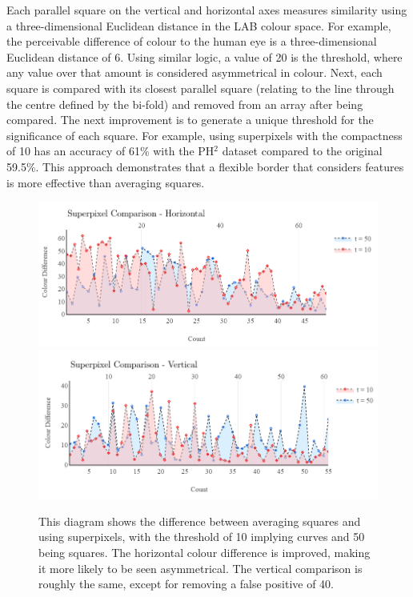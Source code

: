 Each parallel square on the vertical and horizontal axes measures similarity using a three-dimensional Euclidean distance in the LAB colour space. For example, the perceivable difference of colour to the human eye is a three-dimensional Euclidean distance of 6\cite{Myridis2014a}. Using similar logic, a value of 20 is the threshold, where any value over that amount is considered asymmetrical in colour. Next, each square is compared with its closest parallel square (relating to the line through the centre defined by the bi-fold) and removed from an array after being compared. The next improvement is to generate a unique threshold for the significance of each square. For example, using superpixels with the compactness of 10 has an accuracy of 61\% with the PH$^2$ dataset compared to the original 59.5\%. This approach demonstrates that a flexible border that considers features is more effective than averaging squares.

\begin{figure}
\centering
\includegraphics[scale=0.7]{images/superpixel2.png}
\includegraphics[scale=0.7]{images/superpixel1.png}
\caption{This diagram shows the difference between averaging squares and using superpixels, with the threshold of 10 implying curves and 50 being squares. The horizontal colour difference is improved, making it more likely to be seen asymmetrical. The vertical comparison is roughly the same, except for removing a false positive of 40.}
\end{figure}\label{asy3}

